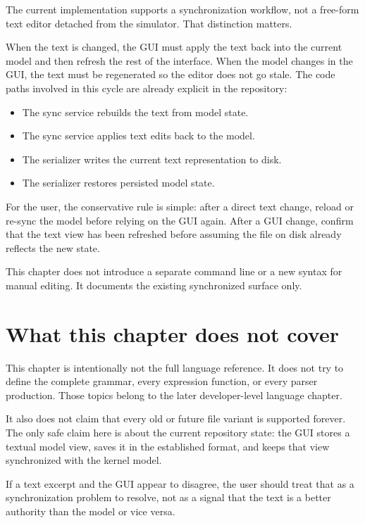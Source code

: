 The current implementation supports a synchronization workflow, not a free-form
text editor detached from the simulator. That distinction matters.

When the text is changed, the GUI must apply the text back into the current
model and then refresh the rest of the interface. When the model changes in the
GUI, the text must be regenerated so the editor does not go stale. The code
paths involved in this cycle are already explicit in the repository:
\begin{itemize}
\item The sync service rebuilds the text from model state.
\item The sync service applies text edits back to the model.
\item The serializer writes the current text representation to disk.
\item The serializer restores persisted model state.
\end{itemize}

For the user, the conservative rule is simple: after a direct text change,
reload or re-sync the model before relying on the GUI again. After a GUI change,
confirm that the text view has been refreshed before assuming the file on disk
already reflects the new state.

This chapter does not introduce a separate command line or a new syntax for
manual editing. It documents the existing synchronized surface only.

\section{What this chapter does not cover}
\label{sec:model-language-limits}

This chapter is intentionally not the full language reference. It does not try
to define the complete grammar, every expression function, or every parser
production. Those topics belong to the later developer-level language chapter.

It also does not claim that every old or future file variant is supported
forever. The only safe claim here is about the current repository state: the
GUI stores a textual model view, saves it in the established format, and keeps
that view synchronized with the kernel model.

If a text excerpt and the GUI appear to disagree, the user should treat that as
a synchronization problem to resolve, not as a signal that the text is a better
authority than the model or vice versa.

